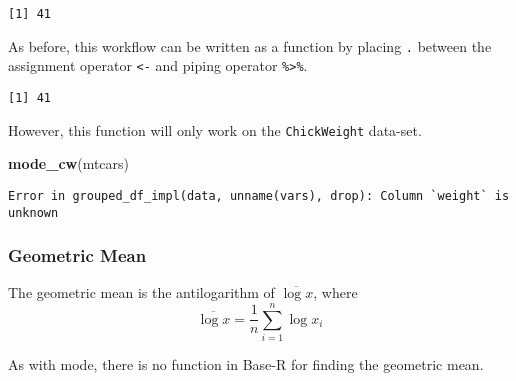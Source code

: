 \documentclass[12pt,]{article}
\newenvironment{Shaded}{\begin{snugshade}}{\end{snugshade}}
\newcommand{\KeywordTok}[1]{\textcolor[rgb]{0.13,0.29,0.53}{\textbf{#1}}}
\newcommand{\DataTypeTok}[1]{\textcolor[rgb]{0.13,0.29,0.53}{#1}}
\newcommand{\DecValTok}[1]{\textcolor[rgb]{0.00,0.00,0.81}{#1}}
\newcommand{\StringTok}[1]{\textcolor[rgb]{0.31,0.60,0.02}{#1}}
\newcommand{\OtherTok}[1]{\textcolor[rgb]{0.56,0.35,0.01}{#1}}
\newcommand{\OperatorTok}[1]{\textcolor[rgb]{0.81,0.36,0.00}{\textbf{#1}}}
\newcommand{\NormalTok}[1]{#1}
\theoremstyle{definition}
\theoremstyle{definition}
\theoremstyle{definition}
\theoremstyle{remark}
\begin{document}
\begin{verbatim}
[1] 41
\end{verbatim}

As before, this workflow can be written as a function by placing
\texttt{.} between the assignment operator \texttt{\textless{}-} and
piping operator \texttt{\%\textgreater{}\%}.

\begin{Shaded}
\end{Shaded}

\begin{verbatim}
[1] 41
\end{verbatim}

However, this function will only work on the \texttt{ChickWeight}
data-set.

\begin{Shaded}
\begin{Highlighting}[]
\KeywordTok{mode_cw}\NormalTok{(mtcars)}
\end{Highlighting}
\end{Shaded}

\begin{verbatim}
Error in grouped_df_impl(data, unname(vars), drop): Column `weight` is unknown
\end{verbatim}

\subsubsection{Geometric Mean}\label{geometric-mean}

The geometric mean is the antilogarithm of \(\overline{\log x}\), where
\[\overline{\log x}= \frac{1}{n}\sum^n_{i=1}\log{x_i}\]

As with mode, there is no function in Base-R for finding the geometric
mean.
\end{document}
